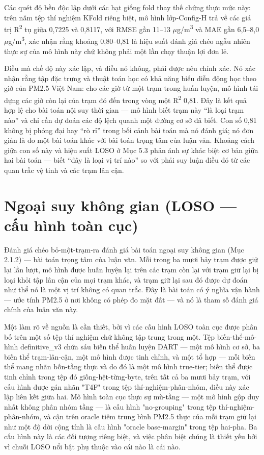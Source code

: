Các quét độ bền độc lập dưới các hạt giống fold thay thế chứng thực mức này: trên năm tệp thí nghiệm KFold riêng biệt, mô hình lớp-Config-H trả về các giá trị R\textsuperscript{2} tụ giữa 0,7225 và 0,8117, với RMSE gần 11--13 $\mu$g/m\textsuperscript{3} và MAE gần 6,5--8,0 $\mu$g/m\textsuperscript{3}, xác nhận rằng khoảng 0,80--0,81 là hiệu suất đánh giá chéo ngẫu nhiên thực sự của mô hình này chứ không phải một lần chạy thuận lợi đơn lẻ.

Điều mà chế độ này xác lập, và điều nó không, phải được nêu chính xác. Nó xác nhận rằng tập đặc trưng và thuật toán học có khả năng biểu diễn động học theo giờ của PM2.5 Việt Nam: cho các giờ từ một trạm trong huấn luyện, mô hình tái dựng các giờ còn lại của trạm đó đến trong vòng một R\textsuperscript{2} 0,81. Đây là kết quả hợp lệ cho bài toán nội suy thời gian --- mô hình biết trạm này ``là loại trạm nào'' và chỉ cần dự đoán các độ lệch quanh một đường cơ sở đã biết. Con số 0,81 không bị phóng đại hay ``rò rỉ'' trong bối cảnh bài toán mà nó đánh giá; nó đơn giản là đo một bài toán khác với bài toán trọng tâm của luận văn. Khoảng cách giữa con số này và hiệu suất LOSO ở Mục 5.3 phản ánh sự khác biệt cơ bản giữa hai bài toán --- biết ``đây là loại vị trí nào'' so với phải suy luận điều đó từ các quan trắc vệ tinh và các trạm lân cận.


\section{Ngoại suy không gian (LOSO --- cấu hình toàn cục)}

Đánh giá chéo bỏ-một-trạm-ra đánh giá bài toán ngoại suy không gian (Mục 2.1.2) --- bài toán trọng tâm của luận văn. Mỗi trong ba mươi bảy trạm được giữ lại lần lượt, mô hình được huấn luyện lại trên các trạm còn lại với trạm giữ lại bị loại khỏi tập lân cận của mọi trạm khác, và trạm giữ lại sau đó được dự đoán như thể nó là một vị trí không có quan trắc. Đây là bài toán có ý nghĩa vận hành --- ước tính PM2.5 ở nơi không có phép đo mặt đất --- và nó là tham số đánh giá chính của luận văn này.

Một làm rõ về nguồn là cần thiết, bởi vì các cấu hình LOSO toàn cục được phân bố trên một số tệp thí nghiệm chứ không tập trung trong một. Tệp biến-thể-mô-hình definitive\_v3 chứa sáu biến thể huấn luyện DART --- một mô hình cơ sở, ba biến thể trạm-lân-cận, một mô hình được tinh chỉnh, và một tổ hợp --- mỗi biến thể mang nhãn bốn-tầng thực và do đó là một mô hình true-tier; biến thể được tinh chỉnh trong tệp đó giống-hệt-từng-byte, trên tất cả ba mươi bảy trạm, với cấu hình được gán nhãn "T4F" trong tệp thí-nghiệm-phân-nhóm, điều này xác lập liên kết giữa hai. Mô hình toàn cục thực sự mù-tầng --- một mô hình gộp duy nhất không phân nhóm tầng --- là cấu hình "no-grouping" trong tệp thí-nghiệm-phân-nhóm, và cận trên oracle tiêm trung bình PM2.5 thực của mỗi trạm giữ lại như một độ dời cộng tính là cấu hình "oracle base-margin" trong tệp hai-pha. Ba cấu hình này là các đối tượng riêng biệt, và việc phân biệt chúng là thiết yếu bởi vì chuỗi LOSO nổi bật phụ thuộc vào cái nào là cái nào.

